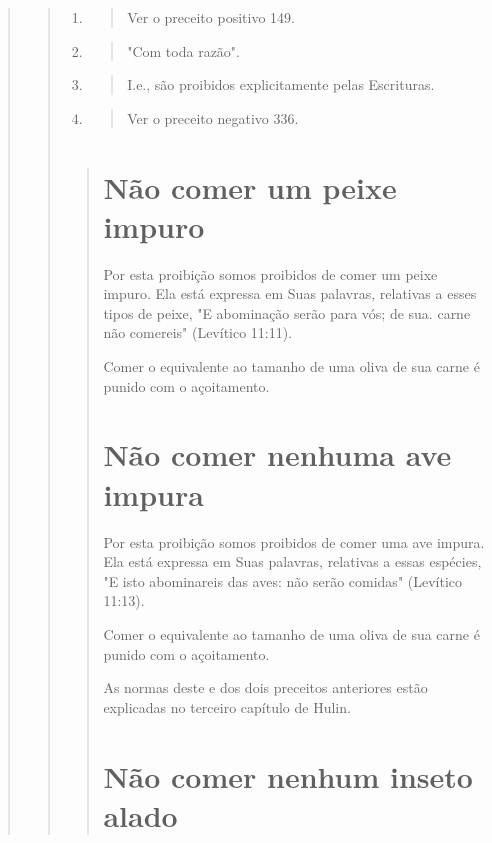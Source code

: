 \begin{quote}
\begin{quote}
\begin{enumerate}
\def\labelenumi{\arabic{enumi}.}
\setcounter{enumi}{341}
\item
 \begin{quote}
 Ver o preceito positivo 149.
 \end{quote}
\item
 \begin{quote}
 "Com toda razão".
 \end{quote}
\item
 \begin{quote}
 I.e., são proibidos explicitamente pelas Escrituras.
 \end{quote}
\item
 \begin{quote}
 Ver o preceito negativo 336.
 \end{quote}
\end{enumerate}

\begin{quote}

\section{Não comer um peixe impuro}

Por esta proibição somos proibidos de comer um peixe impuro. Ela está
expressa em Suas palavras, relativas a esses tipos de peixe, "E
abominação serão para vós; de sua. carne não comereis" (Levítico 11:11).

Comer o equivalente ao tamanho de uma oliva de sua carne é puni­do com o
açoitamento.

\section{Não comer nenhuma ave impura}

Por esta proibição somos proibidos de comer uma ave impura. Ela está
expressa em Suas palavras, relativas a essas espécies, "E isto
abominareis das aves: não serão comidas" (Levítico 11:13).

Comer o equivalente ao tamanho de uma oliva de sua carne é puni­do com o
açoitamento.

As normas deste e dos dois preceitos anteriores estão explicadas no
terceiro capítulo de Hulin.

\section{Não comer nenhum inseto alado}


\end{quote}
\end{quote}
\end{quote}
